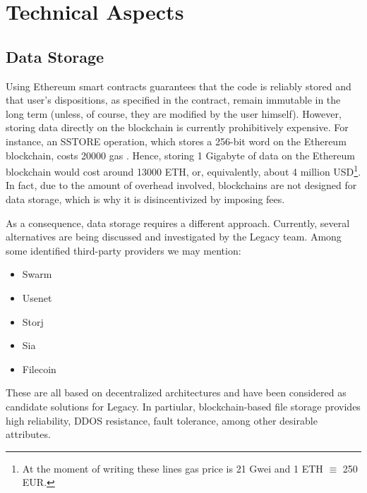 
\section{Technical Aspects} %
\label{sec:technical_aspects}

\subsection{Data Storage} %
\label{sub:data_storage}
Using Ethereum smart contracts guarantees that the code is reliably stored and that user's dispositions, as specified in the contract, remain immutable in the long term (unless, of course, they are modified by the user himself). However, storing data directly on the blockchain is currently prohibitively expensive.
For instance, an SSTORE operation, which stores a 256-bit word on the Ethereum blockchain, costs 20000 gas \cite[Appendix G]{Wood}. Hence, storing 1 Gigabyte of data on the Ethereum blockchain would cost around 13000 ETH, or, equivalently, about 4 million USD\footnote{At the moment of writing these lines gas price is 21 Gwei and 1 ETH $\equiv$ 250 EUR.}.
In fact, due to the amount of overhead involved, blockchains are not designed for data storage, which is why it is disincentivized by imposing fees. 

As a consequence, data storage requires a different approach. Currently, several alternatives are being discussed and investigated by the Legacy team.
Among some identified third-party providers we may mention:

\begin{itemize}
	\item Swarm
	\item Usenet
	\item Storj
	\item Sia
	\item Filecoin
\end{itemize}

These are all based on decentralized architectures and have been considered as candidate solutions for Legacy.
In partiular, blockchain-based file storage provides high reliability, DDOS resistance, fault tolerance, among other desirable attributes. 


